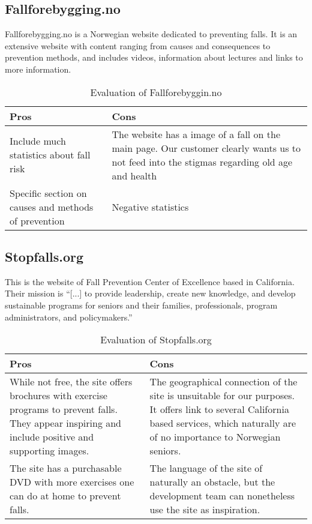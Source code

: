 \subsection{Fallforebygging.no}
Fallforebygging.no \cite{fallforebygging} is a Norwegian website dedicated to preventing falls. It is an extensive website with content ranging from causes and consequences to  prevention methods, and includes videos, information about lectures and links to more information. 
\begin{table}[H]
\begin{center}
\begin{tabu} to 0.8\textwidth{ |X[l]|X[l]| } 
\hline {}
Pros & Cons \\
\hline
Include much statistics about fall risk & 
The website has a image of a fall on the main page. Our customer clearly wants us to not feed into the stigmas regarding old age and health 

\\ 
\hline
Specific section on causes and methods of prevention & Negative statistics \\ 
\hline
\end{tabu}
\end{center}
\caption{Evaluation of Fallforebyggin.no}
\end{table}

\subsection{Stopfalls.org}
This is the website of Fall Prevention Center of Excellence based in California. Their mission is  “[...] to provide leadership, create new knowledge, and develop sustainable programs for seniors and their families, professionals, program administrators, and policymakers.” \cite{stopfalls}


\begin{table}[H]
\begin{center}
\begin{tabu} to 0.8\textwidth{ |X[l]|X[l]| } 
\hline {}
Pros & Cons \\
\hline
While not free, the site offers brochures with exercise programs to prevent falls. They appear inspiring and include positive and supporting images. & 
The geographical connection of the site is unsuitable for our purposes. It offers link to several California based services, which naturally are of no importance to Norwegian seniors.  

\\ 
\hline
The site has a purchasable DVD with more exercises one can do at home to prevent falls.
 & The language of the site of naturally an obstacle, but the development team can nonetheless  use the site as inspiration. 
 
 \\ 
\hline
\end{tabu}
\end{center}
\caption{Evaluation of Stopfalls.org}
\end{table}

